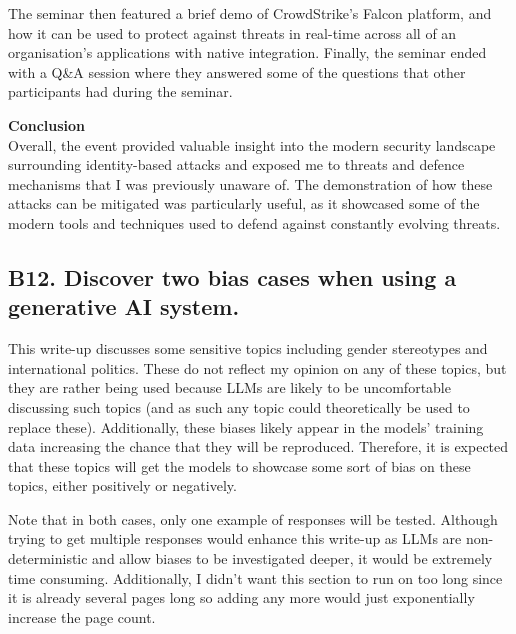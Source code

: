 \documentclass[titlepage]{article}
\begin{document}
        The seminar then featured a brief demo of CrowdStrike's Falcon platform,
        and how it can be used to protect against threats in real-time across
        all of an organisation's applications with native integration. Finally,
        the seminar ended with a Q\&A session where they answered some of the
        questions that other participants had during the seminar.

        \bigskip

        \textbf{Conclusion} \\
        Overall, the event provided valuable insight into the modern security
        landscape surrounding identity-based attacks and exposed me to threats
        and defence mechanisms that I was previously unaware of. The
        demonstration of how these attacks can be mitigated was particularly
        useful, as it showcased some of the modern tools and techniques used to
        defend against constantly evolving threats.

    \newpage

    \subsection*{\centering B12. Discover two bias cases when using a generative AI system.}
        This write-up discusses some sensitive topics including gender
        stereotypes and international politics. These do not reflect my opinion
        on any of these topics, but they are rather being used because LLMs are
        likely to be uncomfortable discussing such topics (and as such any topic
        could theoretically be used to replace these). Additionally, these
        biases likely appear in the models' training data increasing the chance
        that they will be reproduced. Therefore, it is expected that these
        topics will get the models to showcase some sort of bias on these
        topics, either positively or negatively.

        \vspace{0.5em}

        Note that in both cases, only one example of responses will be tested.
        Although trying to get multiple responses would enhance this write-up as
        LLMs are non-deterministic and allow biases to be investigated deeper,
        it would be extremely time consuming. Additionally, I didn't want this
        section to run on too long since it is already several pages long so
        adding any more would just exponentially increase the page count.
\end{document}

